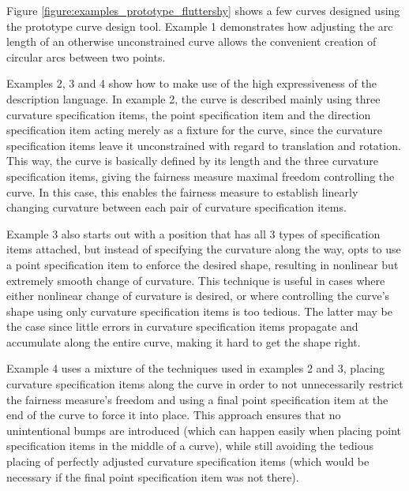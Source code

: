 \documentclass[a4paper]{article}
\begin{document}
			Figure \ref{figure:examples_prototype_fluttershy} shows a few curves designed using the prototype curve design tool. Example 1 demonstrates how adjusting the arc length of an otherwise unconstrained curve allows the convenient creation of circular arcs between two points.

			Examples 2, 3 and 4 show how to make use of the high expressiveness of the description language. In example 2, the curve is described mainly using three curvature specification items, the point specification item and the direction specification item acting merely as a fixture for the curve, since the curvature specification items leave it unconstrained with regard to translation and rotation. This way, the curve is basically defined by its length and the three curvature specification items, giving the fairness measure maximal freedom controlling the curve. In this case, this enables the fairness measure to establish linearly changing curvature between each pair of curvature specification items.

			Example 3 also starts out with a position that has all 3 types of specification items attached, but instead of specifying the curvature along the way, opts to use a point specification item to enforce the desired shape, resulting in nonlinear but extremely smooth change of curvature. This technique is useful in cases where either nonlinear change of curvature is desired, or where controlling the curve's shape using only curvature specification items is too tedious. The latter may be the case since little errors in curvature specification items propagate and accumulate along the entire curve, making it hard to get the shape right.

			Example 4 uses a mixture of the techniques used in examples 2 and 3, placing curvature specification items along the curve in order to not unnecessarily restrict the fairness measure's freedom and using a final point specification item at the end of the curve to force it into place. This approach ensures that no unintentional bumps are introduced (which can happen easily when placing point specification items in the middle of a curve), while still avoiding the tedious placing of perfectly adjusted curvature specification items (which would be necessary if the final point specification item was not there).
\end{document}
